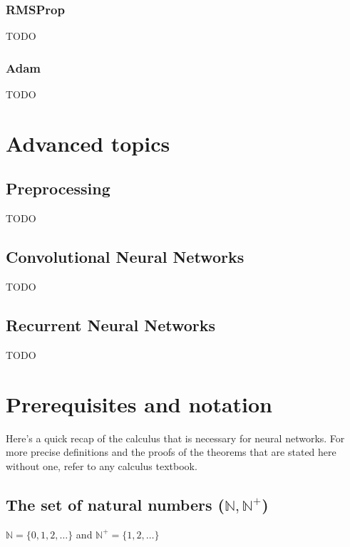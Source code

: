\documentclass[titlepage]{article}
\begin{document}
      \subsubsection{RMSProp}

        TODO

      \subsubsection{Adam}

        TODO

\newpage

  \section{Advanced topics}

    \subsection{Preprocessing}

      TODO

\newpage

    \subsection{Convolutional Neural Networks}

      TODO

\newpage

    \subsection{Recurrent Neural Networks}

      TODO

\newpage

  \appendix

    \section{Prerequisites and notation}

      Here's a quick recap of the calculus that is necessary for neural
      networks. For more precise definitions and the proofs of the theorems that
      are stated here without one, refer to any calculus textbook.

      \subsection{The set of natural numbers ($\mathbb{N}, \mathbb{N}^+$)}
        $\mathbb{N} = \{ 0, 1, 2, \ldots \}$ and
        $\mathbb{N}^+ = \{ 1, 2, \ldots \}$
\end{document}
